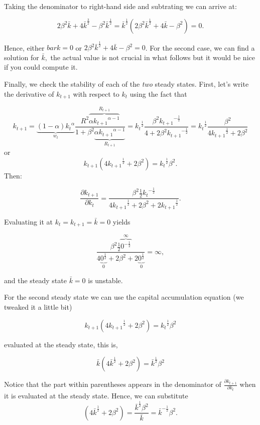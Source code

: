 \documentclass[11pt,twoside,a4paper]{article}
\begin{document}
Taking the denominator to right-hand side and subtrating we can arrive at:

$$2 \beta^2 \bar{k} + 4 \bar{k}^\frac{3}{2} - \beta^2 \bar{k}^\frac{1}{2} = \bar{k}^\frac{1}{2}\left(2 \beta^2 \bar{k}^\frac{1}{2} + 4 \bar{k} - \beta^2\right)=0.$$

Hence, either $bar{k} = 0$ or $2 \beta^2 \bar{k}^\frac{1}{2} + 4\bar{k} - \beta^2 = 0$.
For the second case, we can find a solution for $\bar{k},$ the actual value is not crucial in what follows but it would be nice if you could compute it.

Finally, we check the stability of each of the \emph{two} steady states.
First, let's write the derivative of $k_{t+1}$ with respect to $k_t$ using the fact that

$$k_{t+1} = \underbrace{(1-\alpha){k_t}^\alpha}_{w_t} \frac{R^2 \overbrace{\alpha {k_{t+1}}^{\alpha -1}}^{R_{t+1}}}{1+\beta^2 \underbrace{\alpha {k_{t+1}}^{\alpha -1}}_{R_{t+1}}}= {k_t}^\frac{1}{2} \frac{\beta^2 {k_{t+1}}^{-\frac{1}{2}}}{4+2 \beta^2 {k_{t+1}}^{-\frac{1}{2}}} = {k_t}^\frac{1}{2} \frac{\beta^2}{4 {k_{t+1}}^\frac{1}{2} + 2 \beta^2}$$
or
$$k_{t+1}\left(4 {k_{t+1}}^\frac{1}{2} + 2\beta^2\right) = {k_t}^\frac{1}{2}\beta^2.$$
Then:

$$\frac{\partial k_{t+1}}{\partial k_t} = \frac{\beta^2 \frac{1}{2} {k_t}^{-\frac{1}{2}}}{4 {k_{t+1}}^\frac{1}{2} + 2 \beta^2 + 2 {k_{t+1}}^\frac{1}{2}}.$$

Evaluating it at $k_t = k_{t+1} = \bar{k} = 0$ yields

$$\frac{\beta^2 \frac{1}{2} \overbrace{{0}^{-\frac{1}{2}}}^{\infty}}{4 \underbrace{{0}^\frac{1}{2}}_{0} + 2 \beta^2 + 2 \underbrace{{0}^\frac{1}{2}}_{0}} = \infty,$$

and the steady state $\bar{k}=0$ is unstable.

For the second steady state we can use the capital accumulation equation (we tweaked it a little bit)

$$k_{t+1}\left(4 {k_{t+1}}^\frac{1}{2} + 2\beta^2\right) = {k_t}^\frac{1}{2}\beta^2$$

evaluated at the steady state, this is,

$$\bar{k}\left(4 {\bar{k}}^\frac{1}{2} + 2\beta^2\right) = {\bar{k}}^\frac{1}{2}\beta^2$$

Notice that the part within parentheses appears in the denominator of $\frac{\partial k_{t+1}}{\partial k_t}$ when it is evaluated at the steady state.
Hence, we can substitute 
$$\left(4 {\bar{k}}^\frac{1}{2} + 2\beta^2\right) = \frac{{\bar{k}}^\frac{1}{2}\beta^2}{\bar{k}} = \bar{k}^{-\frac{1}{2}} \beta^2.$$
\end{document}
